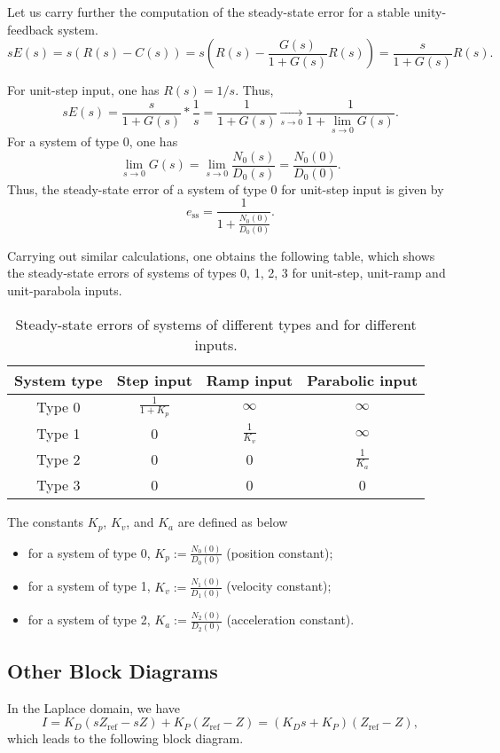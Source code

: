 \documentclass[a4paper,11pt]{report}
\newcommand{\sse}{\mathrm{ss}}
\newcommand{\re}{\mathrm{ref}}
\begin{document}
Let us carry further the computation of the steady-state error for a
stable unity-feedback system.
\[
sE(s) = s(R(s)-C(s)) = s\left(R(s)-\frac{G(s)}{1+G(s)}R(s)\right)=\frac{s}{1+G(s)}R(s).
\]

For unit-step input, one has $R(s)=1/s$. Thus,
\[
sE(s) = \frac{s}{1+G(s)}*\frac{1}{s} = \frac{1}{1+G(s)}
\xrightarrow[s\to 0]{}\frac{1}{1+\lim_{s\to 0}G(s)}.
\]
For a system of type 0, one has
\[
\lim_{s\to 0}G(s) = \lim_{s\to 0}\frac{N_0(s)}{D_0(s)} = \frac{N_0(0)}{D_0(0)}.
\]
Thus, the steady-state error of a system of type 0 for unit-step input
is given by
\[
e_\sse = \frac{1}{1+\frac{N_0(0)}{D_0(0)}}.
\]

Carrying out similar calculations, one obtains the following table,
which shows the steady-state errors of systems of types 0, 1, 2, 3 for
unit-step, unit-ramp and unit-parabola inputs.

\begin{table}[htp]
	\centering
	\begin{tabular}{|c|c|c|c|}
		\hline
		System type&Step input&Ramp input&Parabolic input\\\hline
		Type 0&$\frac{1}{1+K_p}$&$\infty$&$\infty$\\\hline
		Type 1&0&$\frac{1}{K_v}$&$\infty$\\\hline
		Type 2&0&0&$\frac{1}{K_a}$\\\hline
		Type 3&0&0&0\\\hline
	\end{tabular}
	\caption{Steady-state errors of systems of different types and for
		different inputs.}
	\label{tab:systype}
\end{table}

The constants $K_p$, $K_v$, and $K_a$ are defined as below
\begin{itemize}
	\item for a system of type 0, $K_p:=\frac{N_0(0)}{D_0(0)}$ (position constant);
	\item for a system of type 1, $K_v:=\frac{N_1(0)}{D_1(0)}$ (velocity constant);
	\item for a system of type 2, $K_a:=\frac{N_2(0)}{D_2(0)}$
	(acceleration constant).
\end{itemize}

\subsection{Other Block Diagrams}
In the Laplace domain, we have
\[
I = K_D(sZ_\re-sZ) + K_P(Z_\re-Z) = (K_Ds+K_P)(Z_\re-Z),
\]
which leads to the following block diagram.
\end{document}

